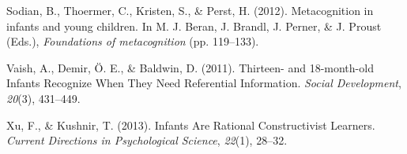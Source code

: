 \documentclass[10pt, letterpaper]{article}
\begin{document}
\hypertarget{ref-Sodian2012}{}
Sodian, B., Thoermer, C., Kristen, S., \& Perst, H. (2012).
Metacognition in infants and young children. In M. J. Beran, J. Brandl,
J. Perner, \& J. Proust (Eds.), \emph{Foundations of metacognition} (pp.
119--133).

\hypertarget{ref-Vaish2011}{}
Vaish, A., Demir, Ö. E., \& Baldwin, D. (2011). Thirteen- and
18-month-old Infants Recognize When They Need Referential Information.
\emph{Social Development}, \emph{20}(3), 431--449.

\hypertarget{ref-Xu2013}{}
Xu, F., \& Kushnir, T. (2013). Infants Are Rational Constructivist
Learners. \emph{Current Directions in Psychological Science},
\emph{22}(1), 28--32.
\end{document}
